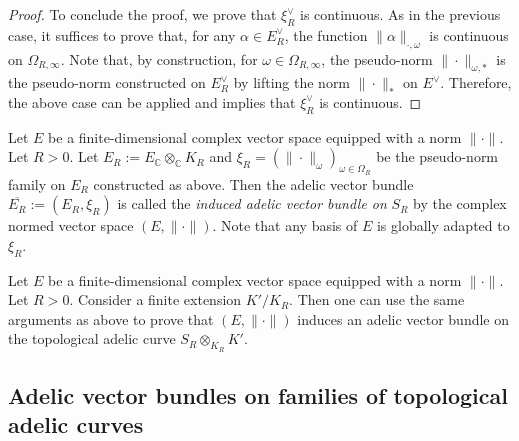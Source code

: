 \documentclass [11pt,reqno]{amsart}
\def\bC{{\mathbb{C}}}
\newcommand{\1}{\mathmybb{1}}
\begin{document}
\begin{proof}
To conclude the proof, we prove that $\xi_R^{\vee}$ is continuous. As in the previous case, it suffices to prove that, for any $\alpha\in E_R^{\vee}$, the function $\|\alpha\|_{\cdot,\omega}$ is continuous on $\Omega_{R,\infty}$. Note that, by construction, for $\omega\in\Omega_{R,\infty}$, the pseudo-norm $\|\cdot\|_{\omega,\ast}$ is the pseudo-norm constructed on $E_R^{\vee}$ by lifting the norm $\|\cdot\|_{\ast}$ on $E^{\vee}$. Therefore, the above case can be applied and implies that $\xi_R^{\vee}$ is continuous. 
\end{proof}

\begin{definition}
\label{def:example_avb_Nevanlinna}
Let $E$ be a finite-dimensional complex vector space equipped with a norm $\|\cdot\|$. Let $R>0$. Let $E_R:= E_{\bC} \otimes_{\bC} K_R$ and $\xi_R = (\|\cdot\|_{\omega})_{\omega\in\Omega_R}$ be the pseudo-norm family on $E_R$ constructed as above. Then the adelic vector bundle $\overline{E_R}:=(E_R,\xi_R)$ is called the \emph{induced adelic vector bundle on} $S_R$ by the complex normed vector space $(E,\|\cdot\|)$. Note that any basis of $E$ is globally adapted to $\xi_R$.
\end{definition}

\begin{remark}
\label{rem:example_avb_Nevanlinna_finite_extension}
Let $E$ be a finite-dimensional complex vector space equipped with a norm $\|\cdot\|$. Let $R>0$. Consider a finite extension $K'/K_R$. Then one can use the same arguments as above to prove that $(E,\|\cdot\|)$ induces an adelic vector bundle on the topological adelic curve $S_R \otimes_{K_R} K'$.
\end{remark}

\subsection{Adelic vector bundles on families of topological adelic curves}
\label{sub:adelic_vector_bundles_families_tac}
\end{document}
